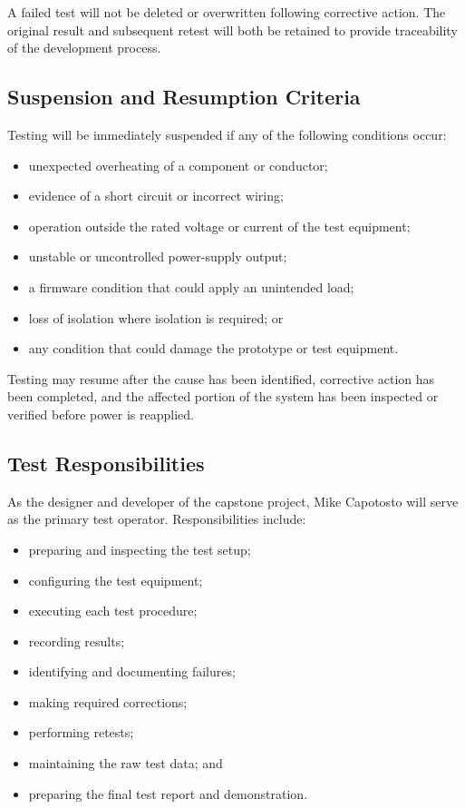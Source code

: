A failed test will not be deleted or overwritten following corrective action. The
original result and subsequent retest will both be retained to provide traceability
of the development process.

\subsection{Suspension and Resumption Criteria}

Testing will be immediately suspended if any of the following conditions occur:

\begin{itemize}
    \item unexpected overheating of a component or conductor;
    \item evidence of a short circuit or incorrect wiring;
    \item operation outside the rated voltage or current of the test equipment;
    \item unstable or uncontrolled power-supply output;
    \item a firmware condition that could apply an unintended load;
    \item loss of isolation where isolation is required; or
    \item any condition that could damage the prototype or test equipment.
\end{itemize}

Testing may resume after the cause has been identified, corrective action has been
completed, and the affected portion of the system has been inspected or verified
before power is reapplied.

\subsection{Test Responsibilities}

As the designer and developer of the capstone project, Mike Capotosto will serve as the
primary test operator. Responsibilities include:

\begin{itemize}
    \item preparing and inspecting the test setup;
    \item configuring the test equipment;
    \item executing each test procedure;
    \item recording results;
    \item identifying and documenting failures;
    \item making required corrections;
    \item performing retests;
    \item maintaining the raw test data; and
    \item preparing the final test report and demonstration.
\end{itemize}

